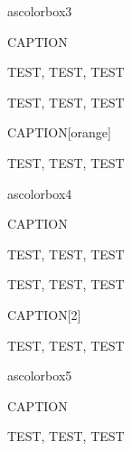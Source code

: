ascolorbox3

\begin{ascolorbox3}{CAPTION}

TEST, TEST, TEST

\end{ascolorbox3}

\begin{ascolorbox3}{}

TEST, TEST, TEST

\end{ascolorbox3}

\begin{ascolorbox3}{CAPTION}[orange]

TEST, TEST, TEST

\end{ascolorbox3}

ascolorbox4

\begin{ascolorbox4}{CAPTION}

TEST, TEST, TEST

\end{ascolorbox4}

\begin{ascolorbox4}{}

TEST, TEST, TEST

\end{ascolorbox4}

\begin{ascolorbox4}{CAPTION}[2]

TEST, TEST, TEST

\end{ascolorbox4}

ascolorbox5

\begin{ascolorbox5}{CAPTION}

TEST, TEST, TEST

\end{ascolorbox5}




